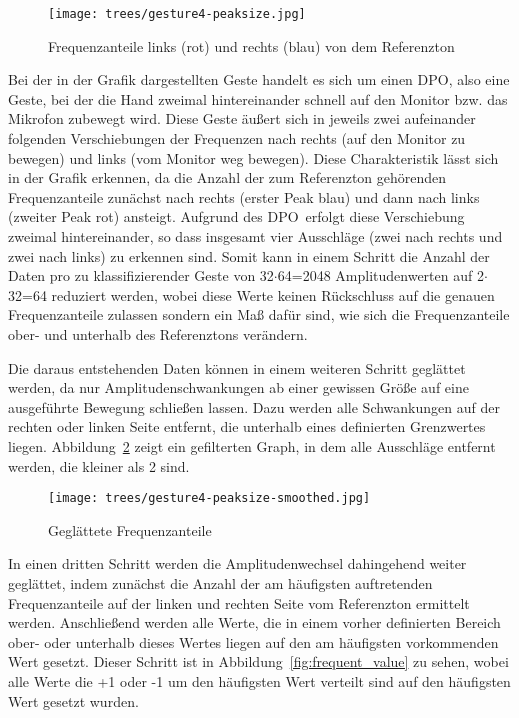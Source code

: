 \begin{figure}[htbp] \centering
\texttt{[image: trees/gesture4-peaksize.jpg]}
\caption{Frequenzanteile links (rot) und rechts (blau) von dem Referenzton}
\label{fig:sum_of_bins}
\end{figure}

Bei der in der Grafik dargestellten Geste handelt es sich um einen \glqq \acl{DPO}\grqq , also eine Geste, bei der die Hand zweimal 
hintereinander schnell auf den Monitor bzw. das Mikrofon zubewegt wird. Diese Geste äußert sich in jeweils zwei aufeinander folgenden 
Verschiebungen der Frequenzen nach rechts (auf den Monitor zu bewegen) und links (vom Monitor weg bewegen). 
Diese Charakteristik lässt sich in der Grafik erkennen, da die Anzahl der zum Referenzton gehörenden Frequenzanteile zunächst nach rechts (erster Peak blau) und dann nach links (zweiter Peak rot) ansteigt. Aufgrund des \glqq \acl{DPO}\grqq\ erfolgt diese 
Verschiebung zweimal hintereinander, so dass insgesamt vier Ausschläge (zwei nach rechts und zwei nach links) zu erkennen sind. 
Somit kann in einem Schritt die Anzahl der Daten pro zu klassifizierender Geste von 32$\cdot$64=2048 Amplitudenwerten 
auf 2$\cdot$32=64 reduziert werden, wobei diese Werte keinen Rückschluss auf die genauen Frequenzanteile zulassen sondern 
ein Maß dafür sind, wie sich die Frequenzanteile ober- und unterhalb des Referenztons verändern.

Die daraus entstehenden Daten können in einem weiteren Schritt geglättet werden, da nur Amplitudenschwankungen ab einer gewissen 
Größe auf eine ausgeführte Bewegung schließen lassen. Dazu werden alle Schwankungen auf der rechten oder linken Seite entfernt, 
die unterhalb eines definierten Grenzwertes liegen. 
Abbildung~\ref{fig:filtered} zeigt ein gefilterten Graph, in dem alle Ausschläge entfernt werden, die kleiner als 2 sind.

\begin{figure}[htbp] \centering
\texttt{[image: trees/gesture4-peaksize-smoothed.jpg]}
\caption{Geglättete Frequenzanteile}
\label{fig:filtered}
\end{figure}

In einen dritten Schritt werden die Amplitudenwechsel dahingehend weiter geglättet, indem zunächst die Anzahl der am häufigsten 
auftretenden Frequenzanteile auf der linken und rechten Seite vom Referenzton ermittelt werden. Anschließend werden alle Werte,
die in einem vorher definierten Bereich ober- oder unterhalb dieses Wertes liegen auf den am häufigsten vorkommenden Wert gesetzt.
Dieser Schritt ist in Abbildung~\ref{fig:frequent_value} zu sehen, wobei alle Werte die +1 oder -1 um den häufigsten Wert verteilt sind 
auf den häufigsten Wert gesetzt wurden.

